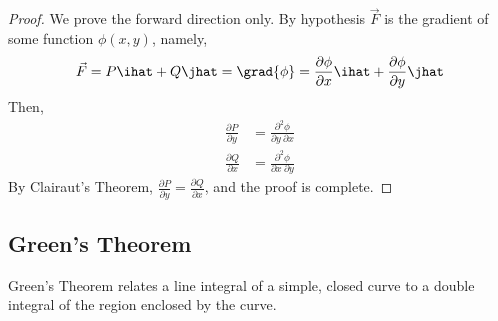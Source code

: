 \documentclass[12pt]{article}
\begin{document}
\begin{proof}
We prove the forward direction only. By hypothesis $\vec{F}$ is the gradient of some function $\phi(x,y)$, namely, \[ \vec{F} = P\ihat + Q\jhat = \grad{\phi} = \frac{\partial \phi}{\partial x}\ihat + \frac{\partial \phi}{\partial y} \jhat\]  
Then, 
\[
\begin{aligned}
\frac{\partial P}{\partial y} &= \frac{\partial^2 \phi}{\partial y \ \partial x} \\
\frac{\partial Q}{\partial x} &= \frac{\partial^2 \phi}{\partial x \ \partial y} 
\end{aligned}
\]
By Clairaut's Theorem, $\frac{\partial P}{\partial y} = \frac{\partial Q}{\partial x}$, and the proof is complete.
\end{proof}

\subsection{Green's Theorem}
Green's Theorem relates a line integral of a simple, closed curve to a double integral of the region enclosed by the curve.
\end{document}

